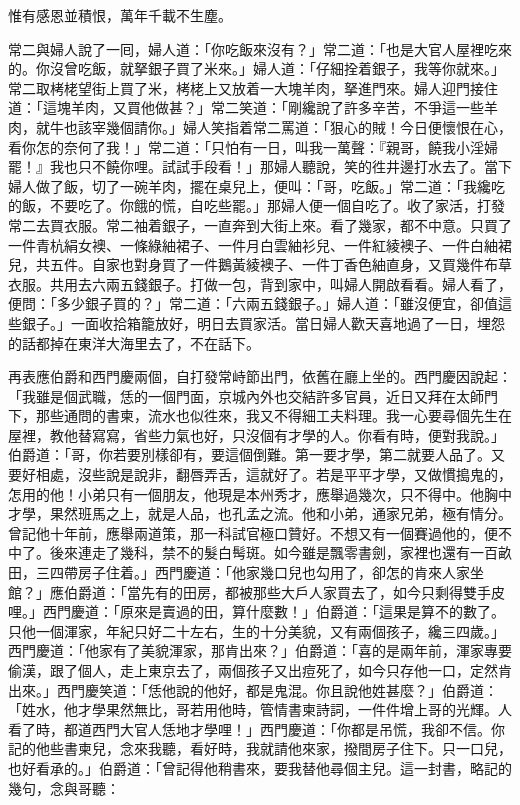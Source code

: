 \begin{myquote}
惟有感恩並積恨，萬年千載不生塵。
\end{myquote}

常二與婦人說了一囘，婦人道：「你吃飯來沒有？」常二道：「也是大官人屋裡吃來的。你沒曾吃飯，就拏銀子買了米來。」婦人道：「仔細拴着銀子，我等你就來。」{}常二取栲栳望街上買了米，栲栳上又放着一大塊羊肉，拏進門來。婦人迎門接住道：「這塊羊肉，又買他做甚？」常二笑道：「剛纔說了許多辛苦，不爭這一些羊肉，就牛也該宰幾個請你。」婦人笑指着常二罵道：「狠心的賊！今日便懷恨在心，看你怎的奈何了我！」常二道：「只怕有一日，叫我一萬聲：『親哥，饒我小淫婦罷！』我也只不饒你哩。試試手段看！」{}那婦人聽說，笑的徃井邊打水去了。當下婦人做了飯，切了一碗羊肉，擺在桌兒上，便叫：「哥，吃飯。」常二道：「我纔吃的飯，不要吃了。你餓的慌，自吃些罷。」那婦人便一個自吃了。收了家活，打發常二去買衣服。常二袖着銀子，一直奔到大街上來。看了幾家，都不中意。只買了一件青杭絹女襖、一條綠紬裙子、一件月白雲紬衫兒、一件紅綾襖子、一件白紬裙兒，共五件。自家也對身買了一件鵝黃綾襖子、一件丁香色紬直身，又買幾件布草衣服。共用去六兩五錢銀子。打做一包，背到家中，叫婦人開啟看看。婦人看了，便問：「多少銀子買的？」常二道：「六兩五錢銀子。」婦人道：「雖沒便宜，卻值這些銀子。」一面收拾箱籠放好，明日去買家活。當日婦人歡天喜地過了一日，埋怨的話都掉在東洋大海里去了，不在話下。

再表應伯爵和西門慶兩個，自打發常峙節出門，依舊在廳上坐的。西門慶因說起：「我雖是個武職，恁的一個門面，京城內外也交結許多官員，近日又拜在太師門下，那些通問的書柬，流水也似徃來，我又不得細工夫料理。我一心要尋個先生在屋裡，教他替寫寫，省些力氣也好，只沒個有才學的人。你看有時，便對我說。」伯爵道：「哥，你若要別樣卻有，要這個倒難。第一要才學，第二就要人品了。又要好相處，沒些說是說非，翻唇弄舌，這就好了。若是平平才學，又做慣搗鬼的，怎用的他！小弟只有一個朋友，他現是本州秀才，應舉過幾次，只不得中。他胸中才學，果然班馬之上，就是人品，也孔孟之流。他和小弟，通家兄弟，極有情分。曾記他十年前，應舉兩道策，那一科試官極口贊好。不想又有一個賽過他的，便不中了。後來連走了幾科，禁不的髮白髩斑。如今雖是飄零書劍，家裡也還有一百畝田，三四帶房子住着。」西門慶道：「他家幾口兒也勾用了，卻怎的肯來人家坐館？」應伯爵道：「當先有的田房，都被那些大戶人家買去了，如今只剩得雙手皮哩。」{}西門慶道：「原來是賣過的田，算什麼數！」伯爵道：「這果是算不的數了。只他一個渾家，年紀只好二十左右，生的十分美貌，又有兩個孩子，纔三四歲。」西門慶道：「他家有了美貌渾家，那肯出來？」伯爵道：「喜的是兩年前，渾家專要偷漢，跟了個人，走上東京去了，兩個孩子又出痘死了，如今只存他一口，定然肯出來。」西門慶笑道：「恁他說的他好，都是鬼混。你且說他姓甚麼？」伯爵道：「姓水，他才學果然無比，哥若用他時，管情書柬詩詞，一件件增上哥的光輝。人看了時，都道西門大官人恁地才學哩！」西門慶道：「你都是吊慌，我卻不信。你記的他些書柬兒，念來我聽，看好時，我就請他來家，撥間房子住下。只一口兒，也好看承的。」伯爵道：「曾記得他稍書來，要我替他尋個主兒。這一封書，略記的幾句，念與哥聽：


